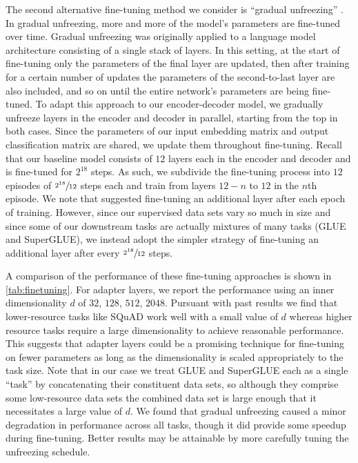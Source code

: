 The second alternative fine-tuning method we consider is ``gradual unfreezing'' \citep{howard2018universal}. In gradual unfreezing, more and more of the model's parameters are fine-tuned over time. Gradual unfreezing was originally applied to a language model architecture consisting of a single stack of layers. In this setting, at the start of fine-tuning only the parameters of the final layer are updated, then after training for a certain number of updates the parameters of the second-to-last layer are also included, and so on until the entire network's parameters are being fine-tuned. To adapt this approach to our encoder-decoder model, we gradually unfreeze layers in the encoder and decoder in parallel, starting from the top in both cases. Since the parameters of our input embedding matrix and output classification matrix are shared, we update them throughout fine-tuning. Recall that our baseline model consists of $12$ layers each in the encoder and decoder and is fine-tuned for $2^{18}$ steps. As such, we subdivide the fine-tuning process into $12$ episodes of $\sfrac{2^{18}}{12}$ steps each and train from layers $12 - n$ to $12$ in the $n$th episode. We note that \cite{howard2018universal} suggested fine-tuning an additional layer after each epoch of training. However, since our supervised data sets vary so much in size and since some of our downstream tasks are actually mixtures of many tasks (GLUE and SuperGLUE), we instead adopt the simpler strategy of fine-tuning an additional layer after every $\sfrac{2^{18}}{12}$ steps.

A comparison of the performance of these fine-tuning approaches is shown in \ref{tab:finetuning}.
For adapter layers, we report the performance using an inner dimensionality $d$ of $32$, $128$, $512$, $2048$. Pursuant with past results \citep{houlsby2019parameter,bapna2019simple} we find that lower-resource tasks like SQuAD work well with a small value of $d$ whereas higher resource tasks require a large dimensionality to achieve reasonable performance. This suggests that adapter layers could be a promising technique for fine-tuning on fewer parameters as long as the dimensionality is scaled appropriately to the task size. Note that in our case we treat GLUE and SuperGLUE each as a single ``task'' by concatenating their constituent data sets, so although they comprise some low-resource data sets the combined data set is large enough that it necessitates a large value of $d$. We found that gradual unfreezing caused a minor degradation in performance across all tasks, though it did provide some speedup during fine-tuning. Better results may be attainable by more carefully tuning the unfreezing schedule.

